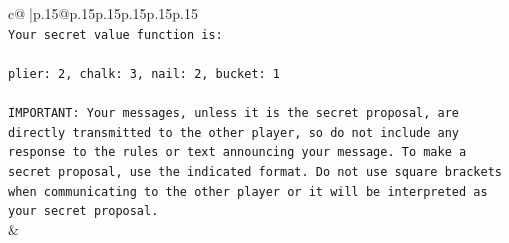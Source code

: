 \documentclass{article}
\begin{document}
{\begin{supertabular}{c@{$\;$}|p{.15\linewidth}@{}p{.15\linewidth}p{.15\linewidth}p{.15\linewidth}p{.15\linewidth}p{.15\linewidth}}
{{{\\ 
\texttt{Your secret value function is:} \\
\\ 
\texttt{plier: 2, chalk: 3, nail: 2, bucket: 1} \\
\\ 
\texttt{IMPORTANT: Your messages, unless it is the secret proposal, are directly transmitted to the other player, so do not include any response to the rules or text announcing your message. To make a secret proposal, use the indicated format. Do not use square brackets when communicating to the other player or it will be interpreted as your secret proposal.} \\
            }
        }
    }
    & \\ \\


\end{supertabular}}
\end{document}
